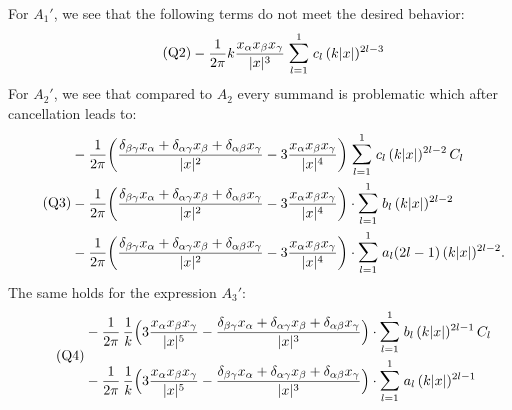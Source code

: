 For $A_1'$, we see that the following terms do not meet the desired behavior:
\begin{align}
  \label{eq:Q2}
  \tag{Q2}
  \begin{alignedat}{1}
  &- \frac{1}{2 \pi } k \frac{x_\alpha x_\beta x_\gamma}{|x|^3} \; \mathlarger{\sum}_{l = 1}^1 \; c_l \, (k|x|)^{2l - 3}  \\
  \end{alignedat}
\end{align}
For $A_2'$, we see that compared to $A_2$ every summand is problematic which after cancellation leads to:
\begin{align}
  \label{eq:Q3}
  \tag{Q3}
  \begin{alignedat}{1}
  &- \frac{1}{2\pi} \bigg(\frac{\delta_{\beta\gamma} x_\alpha + \delta_{\alpha \gamma} x_\beta + \delta_{\alpha \beta} x_\gamma}{|x|^2} - 3 \frac{x_\alpha x_\beta x_\gamma}{|x|^4} \bigg) 
  \; \mathlarger{\sum}_{l = 1}^1 \; c_l \, (k|x|)^{2l - 2} \, C_l \\
  &- \frac{1}{2\pi} \bigg(\frac{\delta_{\beta\gamma} x_\alpha + \delta_{\alpha \gamma} x_\beta + \delta_{\alpha \beta} x_\gamma}{|x|^2} - 3 \frac{x_\alpha x_\beta x_\gamma}{|x|^4} \bigg) 
  \cdot \mathlarger{\sum}_{l = 1}^1 \; b_l \, (k|x|)^{2l - 2}  \\
  &- \frac{1}{2\pi} \bigg(\frac{\delta_{\beta\gamma} x_\alpha + \delta_{\alpha \gamma} x_\beta + \delta_{\alpha \beta} x_\gamma}{|x|^2} - 3 \frac{x_\alpha x_\beta x_\gamma}{|x|^4} \bigg) 
  \cdot \mathlarger{\sum}_{l = 1}^1 \; a_l (2l - 1) \, (k|x|)^{2l - 2} .
  \end{alignedat}
\end{align}
The same holds for the expression $A_3'$:
\begin{align}
  \label{eq:Q4}
  \tag{Q4}
  \begin{alignedat}{1}
    &- \frac{1}{2\pi} \, \frac{1}{k} \Big( 3 \frac{x_\alpha x_\beta x_\gamma}{|x|^5} - \frac{\delta_{\beta\gamma} x_\alpha + \delta_{\alpha\gamma} x_\beta + \delta_{\alpha\beta} x_\gamma}{|x|^3} \Big)  
   \cdot \mathlarger{\sum}_{l = 1}^1 \; b_l \, (k|x|)^{2l - 1} \, C_l  \\
    &- \frac{1}{2\pi} \, \frac{1}{k} \Big( 3 \frac{x_\alpha x_\beta x_\gamma}{|x|^5} - \frac{\delta_{\beta\gamma} x_\alpha + \delta_{\alpha\gamma} x_\beta + \delta_{\alpha\beta} x_\gamma}{|x|^3} \Big)  
  \cdot \mathlarger{\sum}_{l = 1}^1 \; a_l \, (k|x|)^{2l - 1} 
  \end{alignedat}
\end{align}
